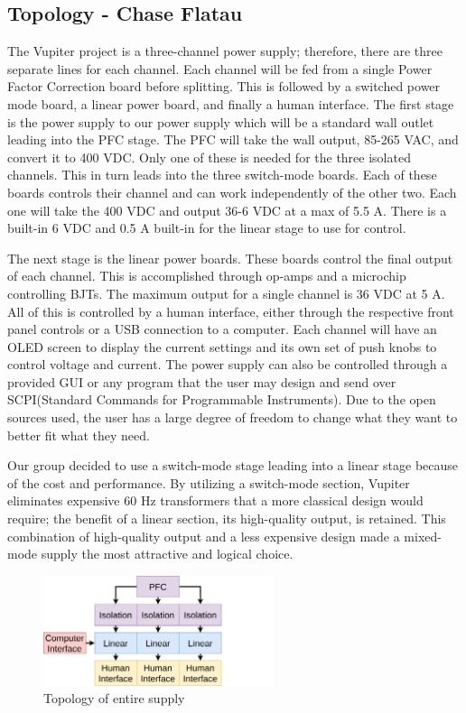 \documentclass[15pt]{article}
\begin{document}
\subsection{Topology - Chase Flatau}
The Vupiter project is a three-channel power supply; therefore, there are three separate lines for each channel. Each channel will be fed from a single Power Factor Correction board before splitting. This is followed by a switched power mode board, a linear power board, and finally a human interface. The first stage is the power supply to our power supply which will be a standard wall outlet leading into the PFC stage. The PFC will take the wall output, 85-265 VAC, and convert it to 400 VDC. Only one of these is needed for the three isolated channels. This in turn leads into the three switch-mode boards. Each of these boards controls their channel and can work independently of the other two. Each one will take the 400 VDC and output 36-6 VDC at a max of 5.5 A. There is a built-in 6 VDC and 0.5 A built-in for the linear stage to use for control.

The next stage is the linear power boards. These boards control the final output of each channel. This is accomplished through op-amps and a microchip controlling BJTs. The maximum output for a single channel is 36 VDC at 5 A. All of this is controlled by a human interface, either through the respective front panel controls or a USB connection to a computer. Each channel will have an OLED screen to display the current settings and its own set of push knobs to control voltage and current. The power supply can also be controlled through a provided GUI or any program that the user may design and send over SCPI(Standard Commands for Programmable Instruments). Due to the open sources used, the user has a large degree of freedom to change what they want to better fit what they need.

Our group decided to use a switch-mode stage leading into a linear stage because of the cost and performance. By utilizing a switch-mode section, Vupiter eliminates expensive 60 Hz transformers that a more classical design would require; the benefit of a linear section, its high-quality output, is retained. This combination of high-quality output and a less expensive design made a mixed-mode supply the most attractive and logical choice.

\begin{figure}[H]
    \centering
    \includegraphics[width=0.6\textwidth]{chase1}
    \caption{Topology of entire supply}
    \label{fig:chase1}
\end{figure}
\end{document}
